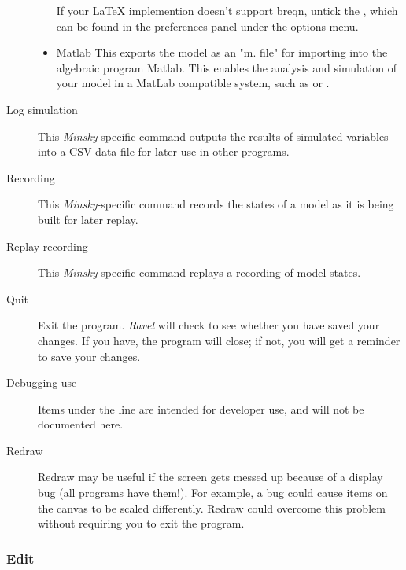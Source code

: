 \begin{description}
\begin{itemize}
If your LaTeX implemention doesn't support breqn, untick the , which can be found in the
preferences panel under the options menu. 
\item Matlab This exports the model as an "m. file" for importing into
the algebraic program Matlab. This enables the analysis and simulation
of your model in a MatLab compatible system, such as 
or .
\end{itemize}
\item [{Log simulation}] This \emph{Minsky}-specific command outputs the
results of simulated variables into a CSV data file for later use
in other programs.
\item [{Recording}] This \emph{Minsky}-specific command records the states
of a model as it is being built for later replay.
\item [{Replay recording}] This \emph{Minsky}-specific command replays
a recording of model states.
\item [{Quit}] Exit the program. \emph{Ravel} will check to see whether
you have saved your changes. If you have, the program will close;
if not, you will get a reminder to save your changes.
\item [{Debugging use}] Items under the line are intended for developer
use, and will not be documented here.
\item [{Redraw}] Redraw may be useful if the screen gets messed up because
of a display bug (all programs have them!). For example, a bug could
cause items on the canvas to be scaled differently. Redraw could overcome
this problem without requiring you to exit the program.
\end{description}

\subsubsection{Edit}

